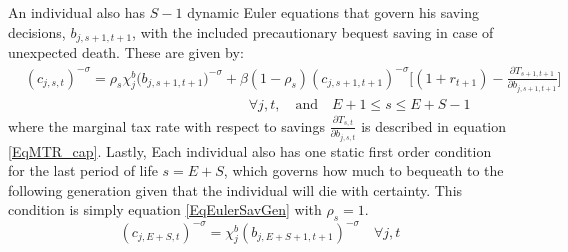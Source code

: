 \documentclass[letterpaper,12pt]{article}
\theoremstyle{definition}
\begin{document}
\begin{spacing}{1.5}
    An individual also has $S-1$ dynamic Euler equations that govern his saving decisions, $b_{j,s+1,t+1}$, with the included precautionary bequest saving in case of unexpected death. These are given by:
    \begin{equation}\label{EqEulerSavGen}
      \begin{split}
        &(c_{j,s,t})^{-\sigma} = \rho_s\chi^b_j\bigl(b_{j,s+1,t+1}\bigr)^{-\sigma} + \beta(1-\rho_s)(c_{j,s+1,t+1})^{-\sigma}\Biggl[(1 + r_{t+1}) - \frac{\partial T_{s+1,t+1}}{\partial b_{j,s+1,t+1}}\Biggr] \\
        &\qquad\qquad\qquad\qquad\qquad\qquad\qquad\qquad\forall j,t,\quad\text{and}\quad E+1\leq s \leq E+S-1
      \end{split}
    \end{equation}
    where the marginal tax rate with respect to savings $\frac{\partial T_{s,t}}{\partial b_{j,s,t}}$ is described in equation \eqref{EqMTR_cap}. Lastly, Each individual also has one static first order condition for the last period of life $s=E+S$, which governs how much to bequeath to the following generation given that the individual will die with certainty. This condition is simply equation \eqref{EqEulerSavGen} with $\rho_s=1$.
    \begin{equation}\label{EqEulerSavEpS}
      (c_{j,E+S,t})^{-\sigma} = \chi^b_j(b_{j,E+S+1,t+1})^{-\sigma} \quad\forall j,t
    \end{equation}


\end{spacing}
\end{document}

